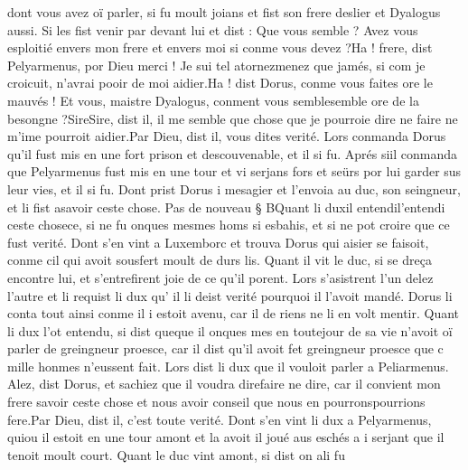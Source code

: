 \documentclass{article}
\begin{document}
\begin{pages}
   dont vous avez oï parler, 
   si fu moult joians et fist son frere deslier et Dyalogus 
   aussi. Si les fist venir par devant lui et dist :
   Que vous semble ? Avez vous esploitié envers mon frere et envers moi si conme vous devez ?Ha ! frere, dist Pelyarmenus, por Dieu merci ! 
      Je sui tel atornezmenez 
      que jamés, si com je 
      croicuit, n’avrai pooir de moi aidier.Ha ! dist Dorus, conme vous faites 
      ore le mauvés ! 
      Et vous, maistre Dyalogus, conment vous 
      semblesemble ore de la besongne ?SireSire, dist il, 
      il me semble que chose que je pourroie dire ne faire ne m’ime pourroit aidier.Par Dieu, dist il, vous dites verité.
   Lors conmanda Dorus qu’il fust mis en une fort prison et descouvenable, 
   et il si fu. Aprés siil conmanda que 
   Pelyarmenus fust mis en une tour et vi
   serjans fors et seürs por lui garder sus leur vies, et il si fu. Dont prist Dorus 
   i mesagier et l’envoia au 
   duc, son seingneur, et li fist asavoir ceste chose. \pend
\pstart Pas de nouveau § BQuant 
   li duxil 
      entendil'entendi 
   ceste chosece, si ne fu 
   onques mesmes homs si esbahis, 
   et si ne pot croire que ce fust verité. Dont s’en vint a Luxemborc et trouva 
   Dorus qui aisier se faisoit, conme cil qui avoit 
   sousfert moult de durs lis. 
   Quant il vit le duc, si se dreça encontre lui, et s’entrefirent joie de ce qu’il porent. 
   Lors s’asistrent l’un delez l’autre et li requist li dux qu’
   il li deist verité pourquoi il l’avoit mandé. 
   Dorus li conta 
   tout ainsi conme il i estoit avenu, car il de riens ne li 
   en volt mentir. 
   Quant li dux l’ot entendu, si dist queque il 
   onques mes en toutejour de sa vie n’avoit 
      oï parler de greingneur proesce, car il dist qu’il avoit fet greingneur proesce que 
         c mille honmes n’eussent fait. 
   Lors dist li dux que 
   il vouloit parler a Peliarmenus.
   Alez, dist Dorus, et sachiez que il voudra 
      direfaire ne dire, 
      car il convient mon frere 
      savoir ceste chose et nous avoir conseil que nous en 
      pourronspourrions fere.Par Dieu, dist il, c’est toute verité.
   Dont s’en vint li dux 
   a Pelyarmenus, 
   quiou il estoit en une tour amont et la avoit il joué aus eschés 
   a i serjant que il tenoit moult court. 
   Quant le duc vint amont, si dist on ali fu 
   

\end{pages}
\end{document}
